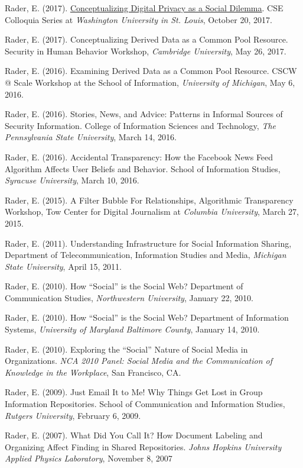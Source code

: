 \documentclass[9pt]{extarticle}
\begin{document}
Rader, E. (2017). \href{https://engineering.wustl.edu/Events/Pages/CSE-Colloquia-Series-Emilee-Rader.aspx}{Conceptualizing Digital Privacy as a Social Dilemma}. CSE Colloquia Series at \emph{Washington University in St. Louis}, October 20, 2017.

Rader, E. (2017). Conceptualizing Derived Data as a Common Pool Resource. Security in Human Behavior Workshop, \emph{Cambridge University}, May 26, 2017.

Rader, E. (2016). Examining Derived Data as a Common Pool Resource. CSCW @ Scale Workshop at the School of Information, \emph{University of Michigan}, May 6, 2016.

Rader, E. (2016). Stories, News, and Advice: Patterns in Informal Sources of Security Information. College of Information Sciences and Technology, \emph{The Pennsylvania State University}, March 14, 2016.

Rader, E. (2016). Accidental Transparency: How the Facebook News Feed Algorithm Affects User Beliefs and Behavior. School of Information Studies, \emph{Syracuse University}, March 10, 2016.

Rader, E. (2015). A Filter Bubble For Relationships, Algorithmic Transparency Workshop, Tow Center for Digital Journalism at \emph{Columbia University}, March 27, 2015.

Rader, E. (2011). Understanding Infrastructure for Social Information Sharing, Department of Telecommunication, Information Studies and Media, \emph{Michigan State University}, April 15, 2011.

Rader, E. (2010). How ``Social'' is the Social Web? Department of Communication Studies, \emph{Northwestern University}, January 22, 2010.

Rader, E. (2010). How ``Social'' is the Social Web? Department of Information Systems, \emph{University of Maryland Baltimore County}, January 14, 2010.

Rader, E. (2010). Exploring the ``Social'' Nature of Social Media in Organizations. \emph{NCA 2010 Panel: Social Media and the Communication of Knowledge in the Workplace}, San Francisco, CA.

Rader, E. (2009). Just Email It to Me! Why Things Get Lost in Group Information Repositories. School of Communication and Information Studies, \emph{Rutgers University}, February 6, 2009.

Rader, E. (2007). What Did You Call It? How Document Labeling and Organizing Affect Finding in Shared Repositories. \emph{Johns Hopkins University Applied Physics Laboratory}, November 8, 2007
\end{document}
